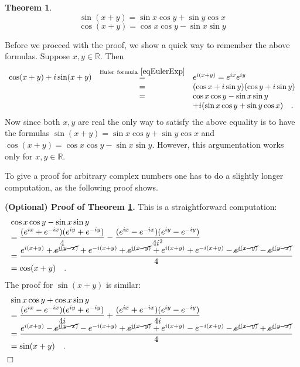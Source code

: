 \documentclass[12pt]{book}
\newenvironment{proofOptional}[1][]{ \noindent \textbf{(Optional) Proof#1.}}{$\Box$\medskip}
\newtheorem{theorem}{Theorem}[section]
\begin{document}
\begin{theorem}\label{thSinCosAngleSum}
\[
\sin(x+ y)=\sin x\cos y +\sin y\cos x
\]
\[
\cos (x+y)= \cos x \cos y - \sin x \sin y
\]
\end{theorem}
Before we proceed with the proof, we show a quick way to remember the above formulas. Suppose $x,y\in \mathbb R$. Then
\[
\begin{array}{rcl}\cos (x+y) + i\sin (x+y)&\stackrel{\mathrm{Euler~formula~}\eqref{eqEulerExp}}{=}& e^{i(x+y)} =e^{ix}e^{iy}\\&=& (\cos x +i \sin y)(\cos y + i \sin y)\\&=& \cos x \cos y - \sin x \sin y\\&& +i(\sin x \cos y+ \sin y \cos x) \quad .\end{array}
\]
Now since both $x,y$ are real the only way to satisfy the above equality is to have the formulas $\sin(x+ y)=\sin x\cos y +\sin y\cos x  $ and $\cos (x+y)=\cos x \cos y - \sin x \sin y$. However, this argumentation works only for $x,y\in \mathbb R$.

To give a proof for arbitrary complex numbers one has to do a slightly longer computation, as the following proof shows.

\begin{proofOptional}[ of Theorem \ref{thSinCosAngleSum}]
This is a straightforward computation:
\[
\begin{array}{l}
\cos x \cos y - \sin x \sin y \\
\displaystyle= \frac{(e^{ix}+e^{-ix})(e^{iy}+e^{-iy})}4 - \frac{(e^{ix}-e^{-ix})(e^{iy}-e^{-iy}) }{4i^2}\\
\displaystyle = \frac{ e^{i(x+y)}+ \cancel{e^{i(y-x)}} +{e^{ -i(x+y)}} + \cancel{e^{i(x-y)}} +e^{i(x+y)}+e^{-i(x+y)}- \cancel{e^{i(x-y)}}- \cancel{e^{ i(y- x)}} }4\\
= \cos(x+y)\quad .\end{array}
\]
The proof for $\sin(x+y)$ is similar:
\[\begin{array}{l}
\sin x \cos y + \cos x \sin y\\
= \displaystyle\frac{(e^{ix}-e^{-ix})(e^{iy}+e^{-iy})}{4i} +\frac{(e^{ix}+e^{-ix})(e^{iy}-e^{-iy}) }{4i}\\
= \displaystyle\frac{ e^{i(x+y)}- \cancel{e^{i(y-x)}} - {e^{-i(x+y)}} + \cancel{e^{i(x-y)}} +e^{i(x+y)}-e^{-i(x+y)}- \cancel{e^{i(x-y)}}+\cancel{e^{i(y-x)}} }4\\
= \displaystyle \sin(x+y)\quad .
\end{array}
\]
\end{proofOptional}
\end{document}
